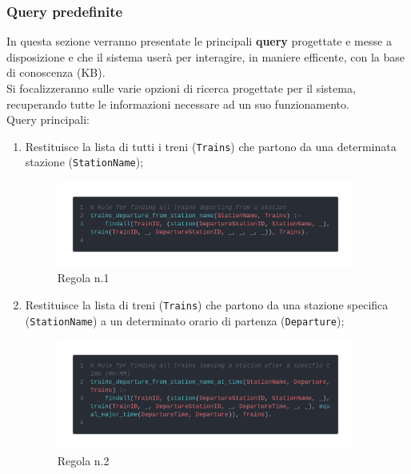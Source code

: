 \documentclass[italian,12pt,a4paper]{article}
\begin{document}
			\subsubsection{Query predefinite}
				In questa sezione verranno presentate le principali \textbf{query} progettate e messe a disposizione e che il sistema userà per interagire, in maniere efficente, con la base di conoscenza (KB).\\
				\linebreak
				Si focalizzeranno sulle varie opzioni di ricerca progettate per il sistema, recuperando tutte le informazioni necessare ad un suo funzionamento. \\
				\linebreak
				Query principali:
				
				
				\begin{enumerate}
					\item Restituisce la lista di tutti i treni (\texttt{Trains}) che partono da una determinata stazione (\texttt{StationName});
						\begin{figure}[h]
							\centering
							\includegraphics[width=370px]{img/code1}
							\caption{Regola n.1}
						\end{figure}
						
					\item Restituisce la lista di treni (\texttt{Trains}) che partono da una stazione specifica (\texttt{StationName}) a un determinato orario di partenza (\texttt{Departure});
						\begin{figure}[h]
							\centering
							\includegraphics[width=370px]{img/code2}
							\caption{Regola n.2}
			

\end{figure}
\end{enumerate}
\end{document}
